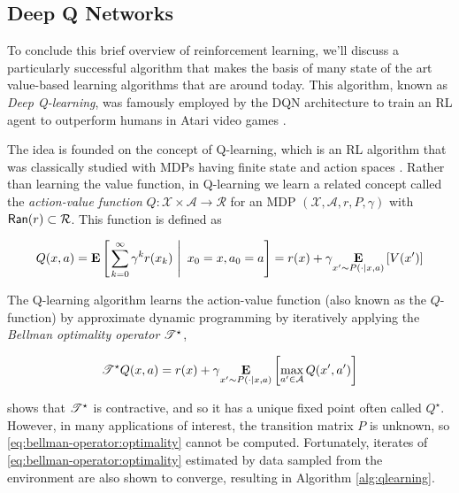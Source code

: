 \subsection{Deep Q Networks}\label{s:dqn}
To conclude this brief overview of reinforcement learning, we'll
discuss a particularly successful algorithm that makes the basis of
many state of the art value-based learning algorithms that are around
today. This algorithm, known as \emph{Deep Q-learning}, was famously
employed by the DQN architecture to train an RL agent to outperform
humans in Atari video games \citep{mnih2015human}.

The idea is founded on the concept of Q-learning, which is an RL
algorithm that was classically studied with MDPs having finite state
and action spaces \citep{watkins1989learning}. Rather than learning
the value function, in Q-learning we learn a related concept called
the \emph{action-value function}
$Q:\mathcal{X}\times\mathcal{A}\to\mathcal{R}$ for an MDP
$(\mathcal{X},\mathcal{A},r,P,\gamma)$ with
$\range(r)\subset\mathcal{R}$. This function is defined as

\begin{equation}
  \label{eq:q-function}
  Q(x, a) = \ConditionExpect{\sum_{k=0}^\infty\gamma^kr(x_k)}{x_0
    = x, a_0 = a} = r(x) + \gamma\Expectation{x'\sim P(\cdot\mid x, a)}{V(x')}
\end{equation}

The Q-learning algorithm learns the action-value function (also known
as the $Q$-function) by approximate dynamic programming by iteratively
applying the \emph{Bellman optimality operator}
$\bellmanoperator[\star]$,

\begin{equation}
  \label{eq:bellman-operator:optimality}
  \bellmanoperator[\star] Q(x, a) = r(x) + \gamma\Expectation{x'\sim
    P(\cdot\mid x, a)}{\max_{a'\in\mathcal{A}}Q(x', a')}
\end{equation}

\citet{denardo1967contraction} shows that $\bellmanoperator[\star]$ is
contractive, and so it has a unique fixed point often called
$Q^\star$. However, in many applications of interest, the transition matrix $P$
is unknown, so \eqref{eq:bellman-operator:optimality} cannot be
computed. Fortunately, iterates of
\eqref{eq:bellman-operator:optimality} estimated by data sampled from
the environment are also shown to converge,
resulting in Algorithm \ref{alg:qlearning}.

